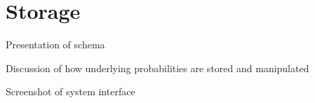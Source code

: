 \section{Storage}

Presentation of schema \newline

\noindent Discussion of how underlying probabilities are stored and manipulated \newline

\noindent Screenshot of system interface





